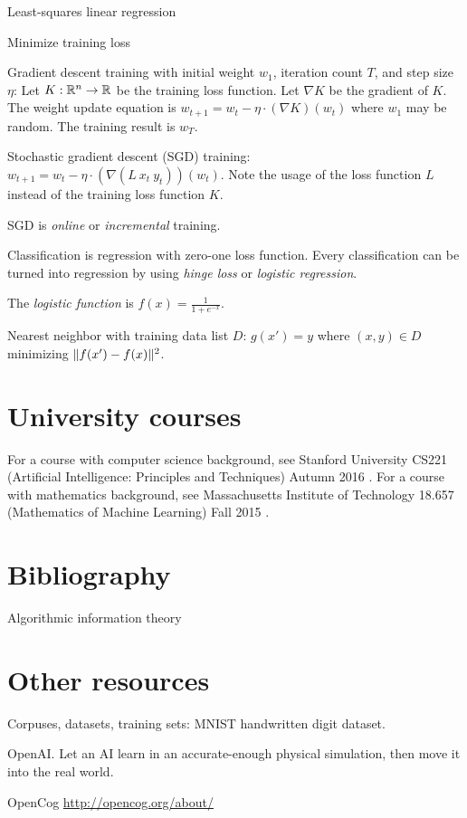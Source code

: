Least-squares linear regression

Minimize training loss

Gradient descent training with initial weight \(w_1\), iteration count \(T\), and step size \(\eta\):
Let \(K : \mathbb{R}^n \to \mathbb{R}\) be the training loss function.
Let \(\nabla K\) be the gradient of \(K\).
The weight update equation is \(w_{t+1} = w_t - \eta \cdot (\nabla K)(w_t)\)
where \(w_1\) may be random.
The training result is \(w_T\).

Stochastic gradient descent (SGD) training:
\(w_{t+1} = w_t - \eta \cdot (\nabla(L~x_t~y_t))(w_t)\).
Note the usage of the loss function \(L\)
instead of the training loss function \(K\).

SGD is \emph{online} or \emph{incremental} training.

Classification is regression with zero-one loss function.
Every classification can be turned into regression
by using \emph{hinge loss} or \emph{logistic regression}.

The
%
\emph{logistic function} is \(f(x) = \frac{1}{1 + e^{-x}}\).

Nearest neighbor with training data list \(D\):
\(g(x') = y\) where \((x,y) \in D\) minimizing \(\lVert f(x') - f(x)\rVert^2\).

\section{University courses}

For a course with computer science background, see
Stanford University CS221 (Artificial Intelligence: Principles and Techniques) Autumn 2016 \cite{LiangCs221}.
For a course with mathematics background, see
Massachusetts Institute of Technology 18.657 (Mathematics of Machine Learning) Fall 2015 \cite{rigollet2015ocw}.

\section{Bibliography}

\cite{DeepArch}

\cite{DeepLearning}

\cite{RepLearn}

\cite{SuttonBartoRein}

Algorithmic information theory
\cite{AlgoInfTh}

\section{Other resources}

Corpuses, datasets, training sets:
MNIST handwritten digit dataset.

OpenAI.
Let an AI learn in an accurate-enough physical simulation,
then move it into the real world.

OpenCog \url{http://opencog.org/about/}
